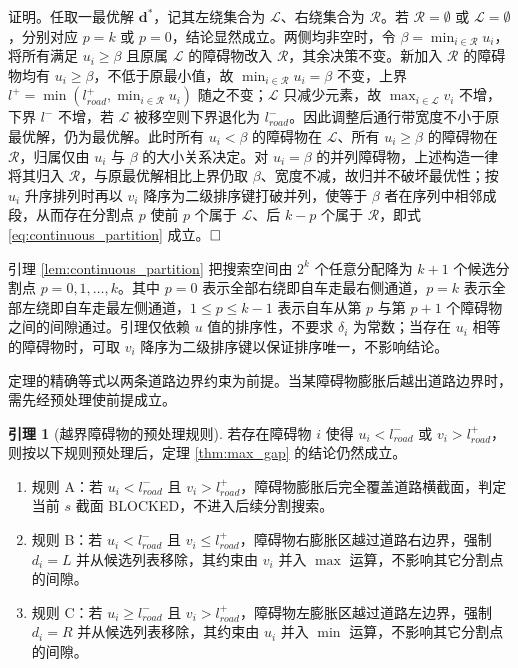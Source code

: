 \documentclass[a4paper,11pt]{ctexart}
\theoremstyle{definition}
\newtheorem{lemma}{引理}[section]
\begin{document}
证明。任取一最优解 $\mathbf{d}^{*}$，记其左绕集合为 $\mathcal{L}$、右绕集合为 $\mathcal{R}$。若 $\mathcal{R}=\emptyset$ 或 $\mathcal{L}=\emptyset$，分别对应 $p=k$ 或 $p=0$，结论显然成立。两侧均非空时，令 $\beta = \min_{i \in \mathcal{R}} u_i$，将所有满足 $u_i \geq \beta$ 且原属 $\mathcal{L}$ 的障碍物改入 $\mathcal{R}$，其余决策不变。新加入 $\mathcal{R}$ 的障碍物均有 $u_i \geq \beta$，不低于原最小值，故 $\min_{i \in \mathcal{R}} u_i = \beta$ 不变，上界 $l^{+} = \min(l_{road}^{+}, \min_{i\in\mathcal{R}} u_i)$ 随之不变；$\mathcal{L}$ 只减少元素，故 $\max_{i \in \mathcal{L}} v_i$ 不增，下界 $l^{-}$ 不增，若 $\mathcal{L}$ 被移空则下界退化为 $l_{road}^{-}$。因此调整后通行带宽度不小于原最优解，仍为最优解。此时所有 $u_i < \beta$ 的障碍物在 $\mathcal{L}$、所有 $u_i \geq \beta$ 的障碍物在 $\mathcal{R}$，归属仅由 $u_i$ 与 $\beta$ 的大小关系决定。对 $u_i = \beta$ 的并列障碍物，上述构造一律将其归入 $\mathcal{R}$，与原最优解相比上界仍取 $\beta$、宽度不减，故归并不破坏最优性；按 $u_i$ 升序排列时再以 $v_i$ 降序为二级排序键打破并列，使等于 $\beta$ 者在序列中相邻成段，从而存在分割点 $p$ 使前 $p$ 个属于 $\mathcal{L}$、后 $k-p$ 个属于 $\mathcal{R}$，即式 \eqref{eq:continuous_partition} 成立。$\hfill\Box$

引理 \ref{lem:continuous_partition} 把搜索空间由 $2^k$ 个任意分配降为 $k+1$ 个候选分割点 $p = 0, 1, \ldots, k$。其中 $p=0$ 表示全部右绕即自车走最右侧通道，$p=k$ 表示全部左绕即自车走最左侧通道，$1 \leq p \leq k-1$ 表示自车从第 $p$ 与第 $p+1$ 个障碍物之间的间隙通过。引理仅依赖 $u$ 值的排序性，不要求 $\delta_i$ 为常数；当存在 $u_i$ 相等的障碍物时，可取 $v_i$ 降序为二级排序键以保证排序唯一，不影响结论。

定理的精确等式以两条道路边界约束为前提。当某障碍物膨胀后越出道路边界时，需先经预处理使前提成立。

\begin{lemma}[越界障碍物的预处理规则]
\label{lem:boundary_trim}
若存在障碍物 $i$ 使得 $u_i < l_{road}^{-}$ 或 $v_i > l_{road}^{+}$，则按以下规则预处理后，定理 \ref{thm:max_gap} 的结论仍然成立。
\begin{enumerate}
    \item 规则 A：若 $u_i < l_{road}^{-}$ 且 $v_i > l_{road}^{+}$，障碍物膨胀后完全覆盖道路横截面，判定当前 $s$ 截面 BLOCKED，不进入后续分割搜索。
    \item 规则 B：若 $u_i < l_{road}^{-}$ 且 $v_i \leq l_{road}^{+}$，障碍物右膨胀区越过道路右边界，强制 $d_i = L$ 并从候选列表移除，其约束由 $v_i$ 并入 $\max$ 运算，不影响其它分割点的间隙。
    \item 规则 C：若 $u_i \geq l_{road}^{-}$ 且 $v_i > l_{road}^{+}$，障碍物左膨胀区越过道路左边界，强制 $d_i = R$ 并从候选列表移除，其约束由 $u_i$ 并入 $\min$ 运算，不影响其它分割点的间隙。
\end{enumerate}
\end{lemma}
\end{document}
